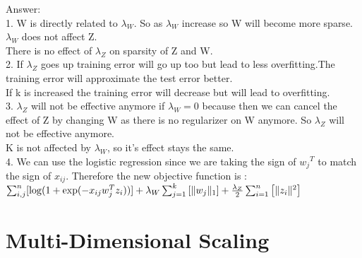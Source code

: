 \documentclass{article}
\begin{document}

Answer:\\
1. W is directly related to $\lambda_W$. So as $\lambda_W$ increase so W will become more sparse.\\
$\lambda_W$ does not affect Z.\\ 
There is no effect of  $\lambda_Z$ on sparsity of Z and W.\\

2. If $\lambda_Z$ goes up training error will go up too but lead to less overfitting.The training error will approximate the test error better.\\
If k is increased the training error will decrease but will lead to overfitting.\\

3. $\lambda_Z$ will not be effective anymore if $\lambda_W = 0$ because then we can cancel the effect of Z by changing W as there is no regularizer on W anymore. So $\lambda_Z$ will not be effective anymore.\\

K is not affected by $\lambda_W$, so it's effect stays the same.\\

4. We can use the logistic regression since we are taking the sign of ${w_j}^T$ to match the sign of $x_{ij}$. Therefore the new objective function is : $\sum_{i,j}^n [\log(1+ \exp(-x_{ij}w_j^Tz_i))] + \lambda_W \sum_{j=1}^k \left[\|w_j\|_1\right] + \frac{\lambda_Z}{2} \sum_{i=1}^n \left[\|z_i\|^2\right]$


\section{Multi-Dimensional Scaling}
\end{document}
